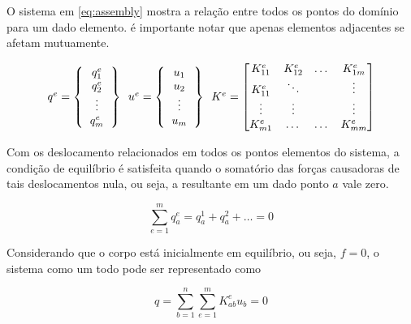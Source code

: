 \documentclass[
    12pt,               %
    openright,          %
    oneside,
    a4paper,            %
    english,            %
    french,             %
    spanish,            %
    brazil              %
    ]{abntex2}
\begin{document}
  O sistema em \ref{eq:assembly} mostra a relação entre todos os pontos do domínio para um dado elemento. é importante notar que apenas elementos adjacentes se afetam mutuamente.
  
 \begin{equation}
    \label{eq:assembly}
    \begin{tabular}{c c c}
    $q^e = 
        \left \{
        \begin{tabular}{c}
            $q^e_1$ \\
            $q^e_2$ \\
            \vdots \\
            $q^e_m$
        \end{tabular}       
        \right \}$
        \
    $u^e = 
        \left \{
        \begin{tabular}{c}
            $u_1$ \\
            $u_2$ \\
            \vdots \\
            $u_m$
        \end{tabular}       
        \right \}   $
        \
        $K^e =
        \begin{bmatrix}
            K^e_{11}    & K^e_{12}  & \dots     & K^e_{1m} \\
            K^e_{11}    & \ddots  & \   & \vdots \\
            \vdots  & \vdots     & \    & \vdots \\
            K^e_{m1}    & \dots   & \dots   & K^e_{mm} 
        \end{bmatrix}    $      
    \end{tabular} 
 \end{equation}
 
 Com os deslocamento relacionados em todos os pontos elementos do sistema,
 a condição de equilíbrio é satisfeita quando o somatório das forças causadoras de tais deslocamentos nula, ou seja, a resultante em um dado ponto $a$ vale zero.
 
  \begin{equation}
    \label{eq:somaForcas}
    \sum_{e=1}^{m}{q_a^e = q_a^1 + q_a^2 + \dots = 0}
  \end{equation}
  
  Considerando que o corpo está inicialmente em equilíbrio, ou seja, $f = 0$, o sistema como um todo pode ser representado como 
  
    \begin{equation}
        \label{eq:equilibrio}
        q =
        \sum_{b=1}^{n}\sum_{e=1}^{m}{K_{ab}^e u_b = 0}
    \end{equation}
    
\end{document}
